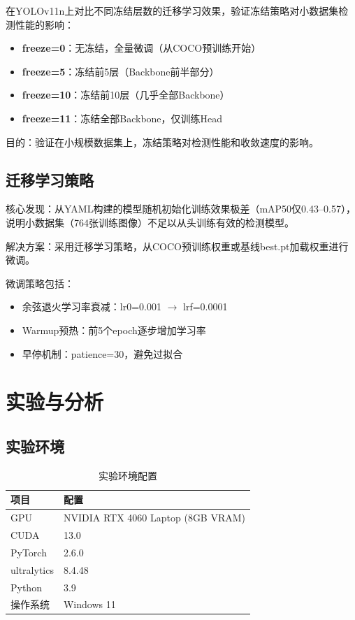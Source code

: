 \documentclass[12pt,a4paper]{article}
\begin{document}
在YOLOv11n上对比不同冻结层数的迁移学习效果，验证冻结策略对小数据集检测性能的影响：

\begin{itemize}[noitemsep]
  \item \textbf{freeze=0}：无冻结，全量微调（从COCO预训练开始）
  \item \textbf{freeze=5}：冻结前5层（Backbone前半部分）
  \item \textbf{freeze=10}：冻结前10层（几乎全部Backbone）
  \item \textbf{freeze=11}：冻结全部Backbone，仅训练Head
\end{itemize}

目的：验证在小规模数据集上，冻结策略对检测性能和收敛速度的影响。

\subsection{迁移学习策略}

核心发现：从YAML构建的模型随机初始化训练效果极差（mAP50仅0.43--0.57），说明小数据集（764张训练图像）不足以从头训练有效的检测模型。

解决方案：采用迁移学习策略，从COCO预训练权重或基线best.pt加载权重进行微调。

微调策略包括：
\begin{itemize}[noitemsep]
  \item 余弦退火学习率衰减：lr0=0.001 $\to$ lrf=0.0001
  \item Warmup预热：前5个epoch逐步增加学习率
  \item 早停机制：patience=30，避免过拟合
\end{itemize}

\section{实验与分析}

\subsection{实验环境}

\begin{table}[H]
\centering
\caption{实验环境配置}
\begin{tabular}{ll}
\toprule
项目 & 配置 \\
\midrule
GPU & NVIDIA RTX 4060 Laptop (8GB VRAM) \\
CUDA & 13.0 \\
PyTorch & 2.6.0 \\
ultralytics & 8.4.48 \\
Python & 3.9 \\
操作系统 & Windows 11 \\
\bottomrule
\end{tabular}
\end{table}
\end{document}
